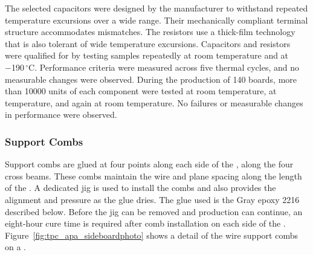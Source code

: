 The selected capacitors were designed by the manufacturer to withstand repeated temperature excursions over a wide range. Their mechanically compliant terminal structure accommodates  mismatches. The resistors use a thick-film technology that is also tolerant of wide temperature excursions.  Capacitors and resistors were qualified for  by testing samples repeatedly at room temperature and at \num{-190}\,$^\circ$C.  Performance criteria were measured across five thermal cycles, and no measurable changes were observed. During the production of \num{140}  boards, more than \num{10000} units of each component were tested at room temperature, at  temperature, and again at room temperature. No failures or measurable changes in performance were observed.




\subsubsection{Support Combs}
\label{sec:combs}

Support combs are glued at four points along each side of the , along the four cross beams. These combs maintain the wire and plane spacing along the length of the . A dedicated jig is used to install the combs and also provides the alignment and pressure as the glue dries. The glue used is the Gray epoxy \num{2216} described below. Before the jig can be removed and production can continue, an eight-hour cure time is required after comb installation on each side of the .  Figure~\ref{fig:tpc_apa_sideboardphoto} shows a detail of the wire support combs on a  .

